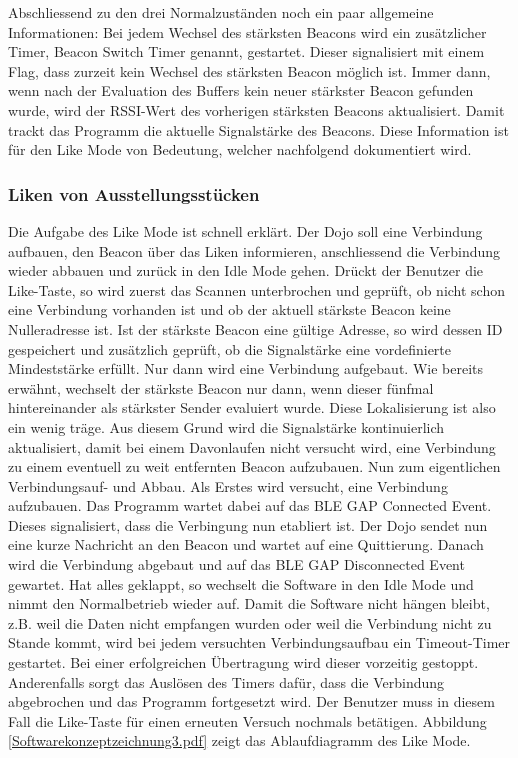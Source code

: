  
Abschliessend zu den drei Normalzuständen noch ein paar allgemeine Informationen: Bei jedem Wechsel des stärksten Beacons wird ein zusätzlicher Timer, Beacon Switch Timer genannt, gestartet. Dieser signalisiert mit einem Flag, dass zurzeit kein Wechsel des stärksten Beacon möglich ist. Immer dann, wenn nach der Evaluation des Buffers kein neuer stärkster Beacon gefunden wurde, wird der RSSI-Wert des vorherigen stärksten Beacons aktualisiert. Damit trackt das Programm die aktuelle Signalstärke des Beacons. Diese Information ist für den Like Mode von Bedeutung, welcher nachfolgend dokumentiert wird.
\subsubsection{Liken von Ausstellungsstücken}
Die Aufgabe des Like Mode ist schnell erklärt. Der Dojo soll eine Verbindung aufbauen, den Beacon über das Liken informieren, anschliessend die Verbindung wieder abbauen und zurück in den Idle Mode gehen.
Drückt der Benutzer die Like-Taste, so wird zuerst das Scannen unterbrochen und geprüft, ob nicht schon eine Verbindung vorhanden ist und ob der aktuell stärkste Beacon keine Nulleradresse ist. Ist der stärkste Beacon eine gültige Adresse, so wird dessen ID gespeichert und zusätzlich geprüft, ob die Signalstärke eine vordefinierte Mindeststärke erfüllt. Nur dann wird eine Verbindung aufgebaut. Wie bereits erwähnt, wechselt der stärkste Beacon nur dann, wenn dieser fünfmal hintereinander als stärkster Sender evaluiert wurde. Diese Lokalisierung ist also ein wenig träge. Aus diesem Grund wird die Signalstärke kontinuierlich aktualisiert, damit bei einem Davonlaufen nicht versucht wird, eine Verbindung zu einem eventuell zu weit entfernten Beacon aufzubauen.
Nun zum eigentlichen Verbindungsauf- und Abbau. Als Erstes wird versucht, eine Verbindung aufzubauen. Das Programm wartet dabei auf das BLE GAP Connected Event. Dieses signalisiert, dass die Verbingung nun etabliert ist. Der Dojo sendet nun eine kurze Nachricht an den Beacon und wartet auf eine Quittierung. Danach wird die Verbindung abgebaut und auf das BLE GAP Disconnected Event gewartet. Hat alles geklappt, so wechselt die Software in den Idle Mode und nimmt den Normalbetrieb wieder auf. Damit die Software nicht hängen bleibt, z.B. weil die Daten nicht empfangen wurden oder weil die Verbindung nicht zu Stande kommt, wird bei jedem versuchten Verbindungsaufbau ein Timeout-Timer gestartet. Bei einer erfolgreichen Übertragung wird dieser vorzeitig gestoppt. Anderenfalls sorgt das Auslösen des Timers dafür, dass die Verbindung abgebrochen und das Programm fortgesetzt wird. Der Benutzer muss in diesem Fall die Like-Taste für einen erneuten Versuch nochmals betätigen. Abbildung \ref{Softwarekonzeptzeichnung3.pdf} zeigt das Ablaufdiagramm des Like Mode.
